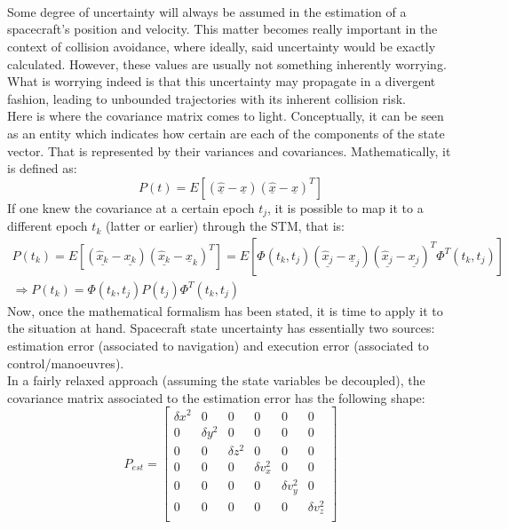 	\paragraph{  \\}
	\indent Some degree of uncertainty will always be assumed in the estimation of a spacecraft's position and velocity. This matter becomes really important in the context of collision avoidance, where ideally, said uncertainty would be exactly calculated. However, these values are usually not something inherently worrying. What is worrying indeed is that this uncertainty may propagate in a divergent fashion, leading to unbounded trajectories with its inherent collision risk.\\
	\indent Here is where the covariance matrix comes to light. Conceptually, it can be seen as an entity which indicates how certain are each of the components of the state vector. That is represented by their variances and covariances. Mathematically, it is defined as:
	\[
	P(t) 	= E\left[ \left(\underline{\hat{x}} - \underline{x}\right) \left(\underline{\hat{x}} - \underline{x}\right)^T \right]
	\]
	\indent If one knew the covariance at a certain epoch $t_j$, it is possible to map it to a different epoch $t_k$ (latter or earlier) through the STM, that is:
	\[
	\begin{array} {c} P(t_k) 	=  E\left[ \left(\underline{\hat{x}_k} - \underline{x_k}\right) \left(\underline{\hat{x}_k} - \underline{x}_k\right)^T \right] = E\left[\Phi(t_k, t_j) \left(\underline{\hat{x}_j} - \underline{x}_j\right) \left(\underline{\hat{x}_j} - \underline{x_j}\right)^T \Phi^T(t_k, t_j)\right] \\[1.3em]
	\Rightarrow P(t_k)=  \Phi(t_k, t_j) P(t_j) \Phi^T(t_k, t_j) \end{array}
	\]
	\indent Now, once the mathematical formalism has been stated, it is time to apply it to the situation at hand. Spacecraft state uncertainty has essentially two sources: estimation error (associated to navigation) and execution error (associated to control/manoeuvres). \\
	\indent In a fairly relaxed approach (\ie assuming the state variables be decoupled), the covariance matrix associated to the estimation error has the following shape:\\
	\begin{equation}
	P_{est} = \left[ \begin{array}{cccccc}
	\delta x^2 	& 0 			& 0 			& 0 			& 0 			& 0 \\
	0 			& \delta y^2	& 0 			& 0 			& 0 			& 0 \\	
	0 			& 0 			& \delta z^2 	& 0 			& 0 			& 0 \\
	0			& 0 			& 0 			& \delta v_x^2 	& 0 			& 0 \\
	0			& 0 			& 0 			& 0				& \delta v_y^2 	& 0 \\
	0			& 0 			& 0 			& 0				& 0 			& \delta v_z^2 \\
	\end{array} \right]
	\label{eqCh1:P_est}
	\end{equation}
